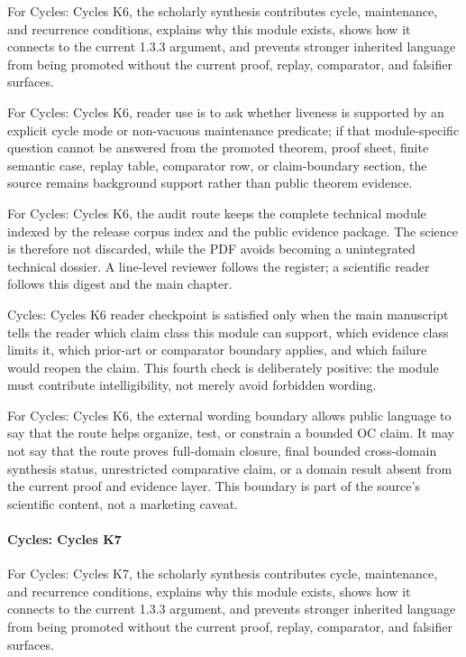 For Cycles: Cycles K6, the scholarly synthesis contributes cycle, maintenance, and recurrence conditions, explains why this module exists, shows how it connects to the current 1.3.3 argument, and prevents stronger inherited language from being promoted without the current proof, replay, comparator, and falsifier surfaces.


For Cycles: Cycles K6, reader use is to ask whether liveness is supported by an explicit cycle mode or non-vacuous maintenance predicate; if that module-specific question cannot be answered from the promoted theorem, proof sheet, finite semantic case, replay table, comparator row, or claim-boundary section, the source remains background support rather than public theorem evidence.


For Cycles: Cycles K6, the audit route keeps the complete technical module indexed by the release corpus index and the public evidence package. The science is therefore not discarded, while the PDF avoids becoming a unintegrated technical dossier. A line-level reviewer follows the register; a scientific reader follows this digest and the main chapter.


Cycles: Cycles K6 reader checkpoint is satisfied only when the main manuscript tells the reader which claim class this module can support, which evidence class limits it, which prior-art or comparator boundary applies, and which failure would reopen the claim. This fourth check is deliberately positive: the module must contribute intelligibility, not merely avoid forbidden wording.


For Cycles: Cycles K6, the external wording boundary allows public language to say that the route helps organize, test, or constrain a bounded OC claim. It may not say that the route proves full-domain closure, final bounded cross-domain synthesis status, unrestricted comparative claim, or a domain result absent from the current proof and evidence layer. This boundary is part of the source's scientific content, not a marketing caveat.


\paragraph{Cycles: Cycles K7}

For Cycles: Cycles K7, the scholarly synthesis contributes cycle, maintenance, and recurrence conditions, explains why this module exists, shows how it connects to the current 1.3.3 argument, and prevents stronger inherited language from being promoted without the current proof, replay, comparator, and falsifier surfaces.


